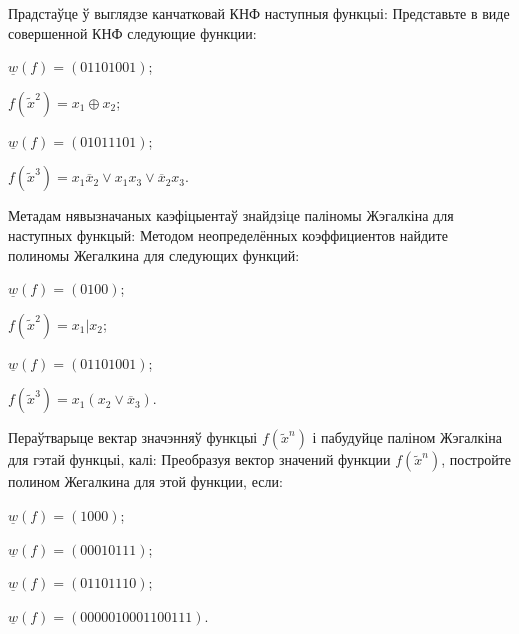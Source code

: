 \documentclass[12pt, a4paper]{article}
\begin{document}
\begin{problemList}
\smallskip

\problemItemWithCommonPart
{Прадстаўце ў выглядзе канчатковай КНФ наступныя функцыі:}
{Представьте в виде совершенной КНФ следующие функции:}
{%
\begin{belarusianEnumerateTwocol}
    \item $\underline{w}(f)=(01101001)$;
    \item $f(\tilde x^2)=x_1\oplus x_2$;
    \item $\underline{w}(f)=(01011101)$;
    \item $f(\tilde x^3)=x_1\overline{x}_2\vee x_1x_3\vee \overline{x}_2x_3$.
\end{belarusianEnumerateTwocol}
}

\smallskip

\problemItemWithCommonPart
{Метадам нявызначаных каэфіцыентаў знайдзіце паліномы Жэгалкіна для наступных функцый:}
{Методом неопределённых коэффициентов найдите полиномы Жегалкина для следующих функций:}
{%
\begin{belarusianEnumerateTwocol}
    \item $\underline{w}(f)=(0100)$;
    \item $f(\tilde x^2)=x_1 | x_2$;
    \item $\underline{w}(f)=(01101001)$;
    \item $f(\tilde x^3)=x_1(x_2 \vee \overline{x}_3)$.
\end{belarusianEnumerateTwocol}
}

\smallskip

\problemItemWithCommonPart
{Пераўтварыце вектар значэнняў функцыі $f(\tilde x^n)$ і пабудуйце паліном Жэгалкіна для гэтай функцыі, калі:}
{Преобразуя вектор значений функции $f(\tilde x^n)$, постройте полином Жегалкина для этой функции, если:}
{%
\begin{belarusianEnumerateTwocol}
    \item $\underline{w}(f)=(1000)$;
    \item $\underline{w}(f)=(00010111)$;
    \item $\underline{w}(f)=(01101110)$;
    \item $\underline{w}(f)=(0000010001100111)$.
\end{belarusianEnumerateTwocol}
}

\smallskip


\end{problemList}
\end{document}
